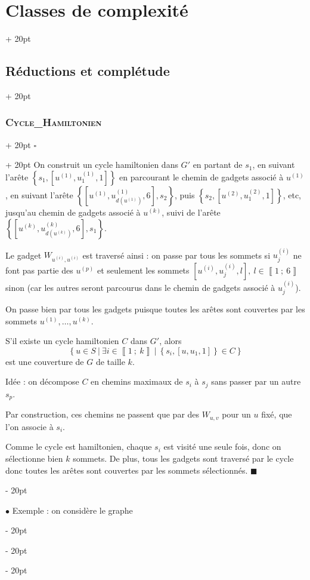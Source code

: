 \documentclass[a4paper, 12pt, twoside]{article}
\newcommand{\nset}[2]{\left\llbracket #1\ ;\ #2 \right\rrbracket}
\newcommand{\lrb}[1]{\left[ #1 \right]}
\newcommand{\set}[1]{\left\{ #1 \right\}}
\newcommand{\ind}[1][20pt]{\advance\leftskip + #1}
\newcommand{\deind}[1][20pt]{\advance\leftskip - #1}
\newenvironment{indt}[2][20pt]{#2 \par \ind[#1]}{\par \deind} %
\newenvironment{proof}[1][{}]{\begin{indt}{$\square$ #1}}{$\blacksquare$ \end{indt}}
\begin{document}
\begin{indt}{\section{Classes de complexité}}
\begin{indt}{\subsection{Réductions et complétude}}
\begin{indt}{\subsubsection{\textsc{Cycle\_Hamiltonien}}}
\begin{proof}
                    On construit un cycle hamiltonien dans $G'$ en partant de $s_1$, en suivant l'arête $\set{s_1, [u^{(1)}, u_1^{(1)}, 1]}$ en parcourant le chemin de gadgets associé à $u^{(1)}$, en suivant l'arête $\set{\lrb{u^{(1)}, u_{d(u^{(1)})}^{(1)}, 6}, s_2}$, puis $\set{s_2, [u^{(2)}, u_1^{(2)}, 1]}$, etc, jusqu'au chemin de gadgets associé à $u^{(k)}$, suivi de l'arête $\set{\lrb{u^{(k)}, u_{d(u^{(k)})}^{(k)}, 6}, s_1}$.

                    Le gadget $W_{u^{(i)}, u^{(i)}}$ est traversé ainsi : on passe par tous les sommets si $u_j^{(i)}$ ne font pas partie des $u^{(p)}$ et seulement les sommets $[u^{(i)}, u_j^{(i)}, l],\ l \in \nset 1 6$ sinon (car les autres seront parcourus dans le chemin de gadgets associé à $u_j^{(i)}$).

                    On passe bien par tous les gadgets puisque toutes les arêtes sont couvertes par les sommets $u^{(1)}, \ldots, u^{(k)}$.

                    \vspace{6pt}
                    
                    \boxed{\Leftarrow} S'il existe un cycle hamiltonien $C$ dans $G'$, alors
                    \[
                        \set{u \in S\ |\ \exists i \in \nset 1 k\ |\ \set{s_i, [u, u_1, 1]} \in C}
                    \]
                    est une couverture de $G$ de taille $k$.

                    Idée : on décompose $C$ en chemins maximaux de $s_i$ à $s_j$ sans passer par un autre $s_p$.

                    Par construction, ces chemins ne passent que par des $W_{u, v}$ pour un $u$ fixé, que l'on associe à $s_i$.

                    Comme le cycle est hamiltonien, chaque $s_i$ est visité une seule fois, donc on sélectionne bien $k$ sommets.
                    De plus, tous les gadgets sont traversé par le cycle donc toutes les arêtes sont couvertes par les sommets sélectionnés.
                \end{proof}

                \vspace{12pt}
                
                $\bullet$ Exemple : on considère le graphe

                \begin{center}
\end{center}
\end{indt}
\end{indt}
\end{indt}
\end{document}
